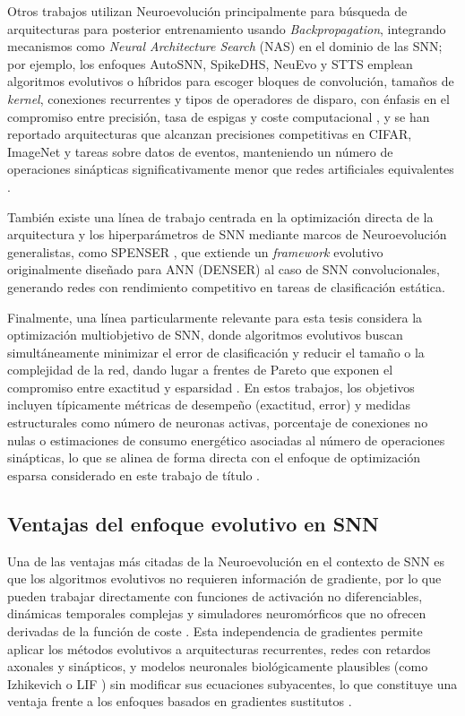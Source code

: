 Otros trabajos utilizan Neuroevolución principalmente para búsqueda de arquitecturas para posterior entrenamiento usando \textit{Backpropagation}, integrando mecanismos como \textit{Neural Architecture Search} (NAS) en el dominio de las SNN; por ejemplo, los enfoques AutoSNN, SpikeDHS, NeuEvo y STTS emplean algoritmos evolutivos o híbridos para escoger bloques de convolución, tamaños de \textit{kernel}, conexiones recurrentes y tipos de operadores de disparo, con énfasis en el compromiso entre precisión, tasa de espigas y coste computacional \cite{Shen2024EvolutionarySNN}, y se han reportado arquitecturas que alcanzan precisiones competitivas en CIFAR, ImageNet y tareas sobre datos de eventos, manteniendo un número de operaciones sinápticas significativamente menor que redes artificiales equivalentes \cite{Shen2024EvolutionarySNN}.

También existe una línea de trabajo centrada en la optimización directa de la arquitectura y los hiperparámetros de SNN mediante marcos de Neuroevolución generalistas, como SPENSER \cite{Branquinho2023-neuro-conv-snn}, que extiende un \textit{framework} evolutivo originalmente diseñado para ANN (DENSER) al caso de SNN convolucionales, generando redes con rendimiento competitivo en tareas de clasificación estática.

Finalmente, una línea particularmente relevante para esta tesis considera la optimización multiobjetivo de SNN, donde algoritmos evolutivos buscan simultáneamente minimizar el error de clasificación y reducir el tamaño o la complejidad de la red, dando lugar a frentes de Pareto que exponen el compromiso entre exactitud y esparsidad \cite{Schuman2022Opportunities, Jin2007evo-multi-snn}. En estos trabajos, los objetivos incluyen típicamente métricas de desempeño (exactitud, error) y medidas estructurales como número de neuronas activas, porcentaje de conexiones no nulas o estimaciones de consumo energético asociadas al número de operaciones sinápticas, lo que se alinea de forma directa con el enfoque de optimización esparsa considerado en este trabajo de título \cite{dimovska2020multiobjectiveoptimizationsizeresilience}.


\subsection{Ventajas del enfoque evolutivo en SNN}
Una de las ventajas más citadas de la Neuroevolución en el contexto de SNN es que los algoritmos evolutivos no requieren información de gradiente, por lo que pueden trabajar directamente con funciones de activación no diferenciables, dinámicas temporales complejas y simuladores neuromórficos que no ofrecen derivadas de la función de coste \cite{Schuman2022Opportunities, Schuman2020evooptineuro}. Esta independencia de gradientes permite aplicar los métodos evolutivos a arquitecturas recurrentes, redes con retardos axonales y sinápticos, y modelos neuronales biológicamente plausibles (como Izhikevich \cite{Izhikevich2003} o LIF \cite{Gao2023anntosnnbipolarlif}) sin modificar sus ecuaciones subyacentes, lo que constituye una ventaja frente a los enfoques basados en gradientes sustitutos \cite{Shen2024EvolutionarySNN}.

